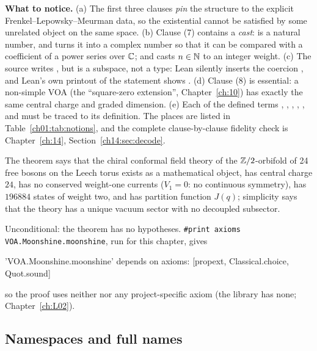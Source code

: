 \begin{dictionary}
\textbf{What to notice.} (a) The first three clauses \emph{pin} the structure to the explicit
Frenkel--Lepowsky--Meurman data, so the existential cannot be satisfied by some unrelated object
on the same space. (b) Clause (7) contains a \emph{cast}:  is a natural
number, and  turns it into a complex number so that it can be compared with a
coefficient of a power series over ${\mathbb{C}}$; and  casts $n\in{\mathbb{N}}$ to an integer weight.
(c) The source writes , but  is a subspace,
not a type: Lean silently inserts the coercion , and Lean's own printout of the statement
shows . (d) Clause (8) is essential: a non-simple VOA (the
``square-zero extension'', Chapter~\ref{ch:10}) has exactly the same central charge and graded
dimension. (e) Each of the defined terms , , ,
, ,  and  must be traced to its
definition. The places are listed in Table~\ref{ch01:tab:notions}, and the complete clause-by-clause
fidelity check is Chapter~\ref{ch:14}, Section~\ref{ch14:sec:decode}.
\end{dictionary}

\begin{physics}
The theorem says that the chiral conformal field theory of the ${\mathbb{Z}}/2$-orbifold of 24 free bosons on
the Leech torus exists as a mathematical object, has central charge $24$, has no conserved weight-one
currents ($V_1 = 0$: no continuous symmetry), has $196884$ states of weight two, and has partition
function $J(q)$; simplicity says that the theory has a unique vacuum sector with no decoupled
subsector.
\end{physics}

\begin{status}
Unconditional: the theorem has no hypotheses. \texttt{\#print axioms VOA.Moonshine.moonshine}, run for
this chapter, gives
\begin{plaincode}
'VOA.Moonshine.moonshine' depends on axioms: [propext, Classical.choice, Quot.sound]
\end{plaincode}
so the proof uses neither  nor any project-specific axiom (the library has none;
Chapter~\ref{ch:L02}).
\end{status}

\subsection{Namespaces and full names}

